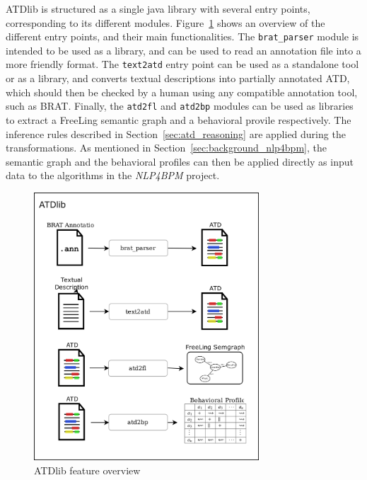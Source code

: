 ATDlib is structured as a single java library with several entry points,
corresponding to its different modules. Figure~\ref{fig:atdlib_architecture}
shows an overview of the different entry points, and their main functionalities.
The \texttt{brat\_parser} module is intended to be used as a library, and can be
used to read an annotation file into a more friendly format. The \texttt{text2atd}
entry point can be used as a standalone tool or as a library, and converts
textual descriptions into partially annotated ATD, which should then be checked
by a human using any compatible annotation tool, such as BRAT. Finally, the
\texttt{atd2fl} and \texttt{atd2bp} modules can be used as libraries to extract
a FreeLing semantic graph and a behavioral provile respectively. The inference
rules described in Section~\ref{sec:atd_reasoning} are applied during the
transformations. As mentioned in Section~\ref{sec:background_nlp4bpm}, the
semantic graph and the behavioral profiles can then be applied directly as input
data to the algorithms in the \emph{NLP4BPM} project.

\begin{figure}[htb]
  \centering
  \includegraphics[width=0.75\textwidth]{figures/atdlib_arch}
  \caption{ATDlib feature overview}
  \label{fig:atdlib_architecture}
\end{figure}


